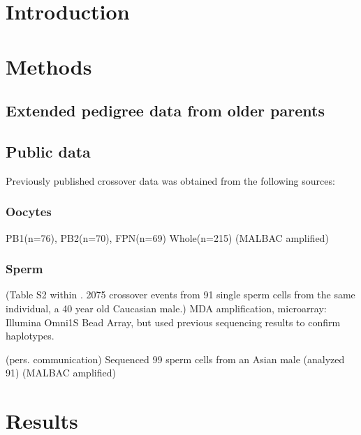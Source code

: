 

\section{Introduction}

\section{Methods}

\subsection{Extended pedigree data from older parents}

\subsection{Public data}
Previously published crossover data was obtained from the following sources:

\subsubsection{Oocytes}
\cite{Hou2013}
PB1(n=76), PB2(n=70), FPN(n=69)
Whole(n=215)
(MALBAC amplified)

\subsubsection{Sperm}
\cite{Wang2012} (Table S2 within \citet{Wang2012}. 2075 crossover events from 91 single sperm cells from the same individual, a 40 year old Caucasian male.)
MDA amplification, microarray: Illumina Omni1S Bead Array, but used previous sequencing results to confirm haplotypes.

\cite{Lu2012b} (pers. communication)
Sequenced 99 sperm cells from an Asian male (analyzed 91)
(MALBAC amplified)


\section{Results}
